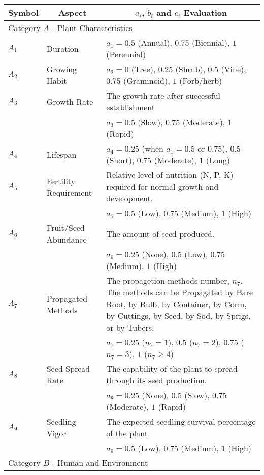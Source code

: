 \documentclass[12pt]{article}
\begin{document}
		{
			\fontsize{10}{14}\selectfont
			{
			\begin{longtable}{p{0.2in}p{1.5in}p{4.3in}}
			
				\toprule
				\multicolumn{1}{c}{\textbf{Symbol}} 
					& \multicolumn{1}{c}{\textbf{Aspect}}
					& \multicolumn{1}{c}{\textbf{$a_i$, $b_i$ and $c_i$ Evaluation}} \\
			
				\toprule
				\multicolumn{3}{l}{Category $A$ - Plant Characteristics}\\
				\midrule
				
				$A_1$ & Duration & $a_1=0.5$ (Annual), $0.75$ (Biennial), $1$ (Perennial)\\
				$A_2$ & Growing Habit & $a_2=0$ (Tree), $0.25$ (Shrub), $0.5$ (Vine), $0.75$ (Graminoid), $1$ (Forb/herb)\\ 
				$A_3$ & Growth Rate & The growth rate after successful establishment\\
					&& $a_3=0.5$ (Slow), $0.75$ (Moderate), $1$ (Rapid)\\
				$A_4$ & Lifespan & $a_4=0.25$ (when $a_1=0.5$ or $0.75$), $0.5$ (Short), $0.75$ (Moderate), $1$ (Long) \\
				$A_5$ & Fertility Requirement & Relative level of nutrition (N, P, K) required for normal growth and development.\\
					 && $a_5=0.5$ (Low), $0.75$ (Medium), $1$ (High)\\
				$A_6$ & Fruit/Seed Abundance & The amount of seed produced.\\
					&& $a_6=0.25$ (None), $0.5$ (Low), $0.75$ (Medium), $1$ (High)\\
				$A_7$ & Propagated Methods & The propagetion methods number, $n_7$. The methods can be Propagated by Bare Root, by Bulb, by Container, by Corm, by Cuttings, by Seed, by Sod, by Sprigs, or by Tubers. \\
					&& $a_7=0.25$ ($n_7=1$), $0.5$ ($n_7=2$), $0.75$ ($n_7=3$), $1$ ($n_7\geq4$)\\
				$A_8$ & Seed Spread Rate & The capability of the plant to spread through its seed production.\\
					&& $a_8=0.25$ (None), $0.5$ (Slow), $0.75$ (Moderate), $1$ (Rapid)\\
				$A_9$ & Seedling Vigor & The expected seedling survival percentage of the plant\\
					&& $a_9=0.5$ (Low), $0.75$ (Medium), $1$ (High)\\
				
				\midrule
				\multicolumn{3}{l}{Category $B$ - Human and Environment}  \\
				\midrule
				

\end{longtable}}}
\end{document}
